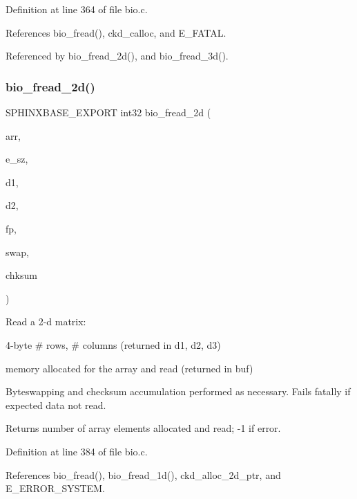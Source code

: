Definition at line 364 of file bio.\+c.



References bio\+\_\+fread(), ckd\+\_\+calloc, and E\+\_\+\+F\+A\+T\+AL.



Referenced by bio\+\_\+fread\+\_\+2d(), and bio\+\_\+fread\+\_\+3d().

\mbox{\label{bio_8h_a70604d0f8035f0868f9284fa82e4fdb8}} 
\subsubsection{bio\+\_\+fread\+\_\+2d()}
{\footnotesize\ttfamily S\+P\+H\+I\+N\+X\+B\+A\+S\+E\+\_\+\+E\+X\+P\+O\+RT int32 bio\+\_\+fread\+\_\+2d (\begin{DoxyParamCaption}\item[{void $\ast$$\ast$$\ast$}]{arr,  }\item[{size\+\_\+t}]{e\+\_\+sz,  }\item[{uint32 $\ast$}]{d1,  }\item[{uint32 $\ast$}]{d2,  }\item[{F\+I\+LE $\ast$}]{fp,  }\item[{uint32}]{swap,  }\item[{uint32 $\ast$}]{chksum }\end{DoxyParamCaption})}



Read a 2-\/d matrix\+: 


\begin{DoxyItemize}
\item 4-\/byte \# rows, \# columns (returned in d1, d2, d3)
\item memory allocated for the array and read (returned in buf)
\end{DoxyItemize}

Byteswapping and checksum accumulation performed as necessary. Fails fatally if expected data not read. \begin{DoxyReturn}{Returns}
number of array elements allocated and read; -\/1 if error. 
\end{DoxyReturn}


Definition at line 384 of file bio.\+c.



References bio\+\_\+fread(), bio\+\_\+fread\+\_\+1d(), ckd\+\_\+alloc\+\_\+2d\+\_\+ptr, and E\+\_\+\+E\+R\+R\+O\+R\+\_\+\+S\+Y\+S\+T\+EM.

